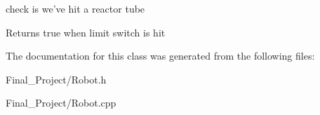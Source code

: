 check is we've hit a reactor tube 

\begin{DoxyReturn}{Returns}
true when limit switch is hit 
\end{DoxyReturn}


The documentation for this class was generated from the following files\-:\begin{DoxyCompactItemize}
\item 
Final\-\_\-\-Project/Robot.\-h\item 
Final\-\_\-\-Project/Robot.\-cpp\end{DoxyCompactItemize}
